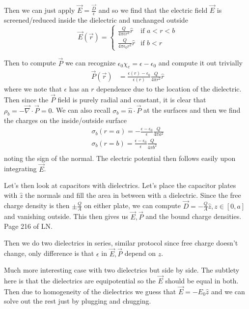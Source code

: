 \documentclass[10pt]{report}
\begin{document}
Then we can just apply $\vec{E} = \frac{\vec{D}}{\epsilon}$ and so we find that the electric field $\vec{E}$ is screened/reduced inside the dielectric and unchanged outside
\begin{equation}
    \vec{E}(\vec{r}) = 
    \begin{cases}
        \frac{Q}{4\pi\epsilon r^2}\hat{r} & \mbox{if } a < r < b\\
        \frac{Q}{4\pi\epsilon_0 r^2}\hat{r} & \mbox{if } b < r
    \end{cases}
\end{equation}

Then to compute $\vec{P}$ we can recognize $\epsilon_0 \chi_e = \epsilon - \epsilon_0$ and compute it out trivially
\begin{align}
    \vec{P}(\vec{r}) &= \frac{\epsilon(r) - \epsilon_0}{\epsilon(r)}\frac{Q}{4\pi r^2}\hat{r}
\end{align}
where we note that $\epsilon$ has an $r$ dependence due to the location of the dielectric. Then since the $\vec{P}$ field is purely radial and constant, it is clear that $\rho_b = -\vec{\nabla}\cdot \vec{P} = 0$. We can also recall $\sigma_b = \hat{n}\cdot \vec{P}$ at the surfaces and then we find the charges on the inside/outside surface
\begin{align}
    \sigma_b(r=a) = -\frac{\epsilon - \epsilon_0}{\epsilon}\frac{Q}{4\pi a^2}\\
    \sigma_b(r=b) = \frac{\epsilon - \epsilon_0}{\epsilon}\frac{Q}{4\pi b^2}\\
\end{align}
noting the sign of the normal. The electric potential then follows easily upon integrating $\vec{E}$. 

Let's then look at capacitors with dielectrics. Let's place the capacitor plates with $\hat{z}$ the normals and fill the area in between with a dielectric. Since the free charge density is then $\pm \frac{Q}{A}$ on either plate, we can compute $\vec{D} = -\frac{Q}{A}\hat{z}, z \in [0,a]$ and vanishing outside. This then gives us $\vec{E}, \vec{P}$ and the bound charge densities. Page 216 of LN.

Then we do two dielectrics in series, similar protocol since free charge doesn't change, only difference is that $\epsilon$ in $\vec{E}, \vec{P}$ depend on $z$. 

Much more interesting case with two dielectrics but side by side. The subtlety here is that the dielectrics are equipotential so the $\vec{E}$ should be equal in both. Then due to homogeneity of the dielectrics we guess that $\vec{E} = -E_0\hat{z}$ and we can solve out the rest just by plugging and chugging. 
\end{document}
